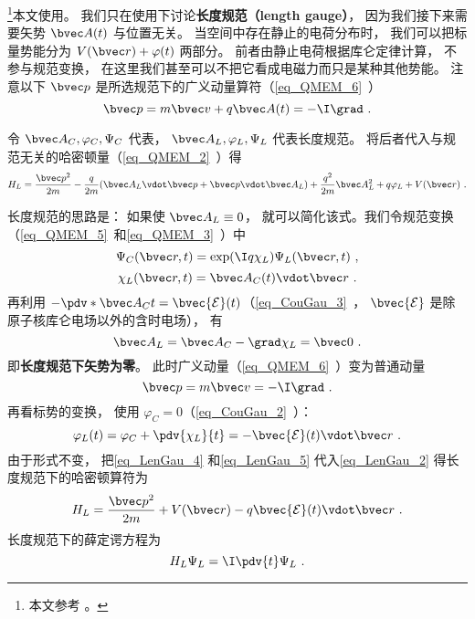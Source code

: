 

\footnote{本文参考 \cite{Bransden}。}本文使用。 我们只在使用下讨论\textbf{长度规范（length gauge）}， 因为我们接下来需要矢势 $\bvec A(t)$ 与位置无关。 当空间中存在静止的电荷分布时， 我们可以把标量势能分为 $V(\bvec r) + \varphi(t)$ 两部分。 前者由静止电荷根据库仑定律计算， 不参与规范变换， 在这里我们甚至可以不把它看成电磁力而只是某种其他势能。
注意以下 $\bvec p$ 是所选规范下的广义动量算符（\autoref{eq_QMEM_6}~）
\begin{equation}
\bvec p = m \bvec v + q\bvec A(t) = -\I \grad~.
\end{equation}

令 $\bvec A_C, \varphi_C, \Psi_C$ 代表， $\bvec A_L, \varphi_L, \Psi_L$ 代表长度规范。 将后者代入与规范无关的哈密顿量（\autoref{eq_QMEM_2}~）得
\begin{equation}\label{eq_LenGau_2}
H_L = \frac{\bvec p^2}{2m} - \frac{q}{2m} (\bvec A_L \vdot \bvec p + \bvec p \vdot \bvec A_L) + \frac{q^2}{2m} \bvec A_L^2 + q \varphi_L + V(\bvec r)~.
\end{equation}


长度规范的思路是： 如果使 $\bvec A_L \equiv 0$， 就可以简化该式。我们令规范变换（\autoref{eq_QMEM_5}~和\autoref{eq_QMEM_3}~）中
\begin{equation}\label{eq_LenGau_1}
\Psi_C(\bvec r, t) = \exp(\I q\chi_L)\Psi_L(\bvec r, t)~,
\end{equation}
\begin{equation}
\chi_L(\bvec r, t) = \bvec A_C(t) \vdot \bvec r~.
\end{equation}
再利用 $-\pdv*{\bvec A_C}{t} = \bvec {\mathcal E}(t)$（\autoref{eq_CouGau_3}~， $\bvec {\mathcal E}$ 是除原子核库仑电场以外的含时电场）， 有
\begin{equation}\label{eq_LenGau_4}
\bvec A_L = \bvec A_C - \grad \chi_L = \bvec 0~.
\end{equation}
即\textbf{长度规范下矢势为零}。 此时广义动量（\autoref{eq_QMEM_6}~）变为普通动量
\begin{equation}\label{eq_LenGau_6}
\bvec p = m \bvec v = -\I \grad~.
\end{equation}
再看标势的变换， 使用 $\varphi_C = 0$（\autoref{eq_CouGau_2}~）：
\begin{equation}\label{eq_LenGau_5}
\varphi_L(t) = \varphi_C + \pdv{\chi_L}{t} = -\bvec {\mathcal E}(t) \vdot \bvec r~.
\end{equation}
由于形式不变， 把\autoref{eq_LenGau_4} 和\autoref{eq_LenGau_5} 代入\autoref{eq_LenGau_2} 得长度规范下的哈密顿算符为
\begin{equation}\label{eq_LenGau_7}
H_L = \frac{\bvec p^2}{2m} + V(\bvec r) - q\bvec{\mathcal{E}}(t) \vdot \bvec r~.
\end{equation}
长度规范下的薛定谔方程为
\begin{equation}\label{eq_LenGau_3}
H_L \Psi_L = \I \pdv{t} \Psi_L~.
\end{equation}
